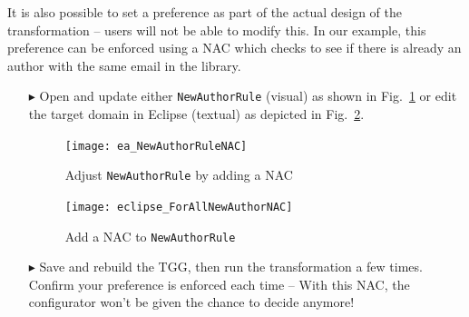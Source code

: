 It is also possible to set a preference as part of the actual design of the transformation -- users will not be able to modify this. In our example, this
preference can be enforced using a NAC which checks to see if there is already an author with the same email in the library.

\begin{itemize}

\item[$\blacktriangleright$] Open and update either \texttt{NewAuthorRule} (visual) as shown in Fig.~\ref{ea:existingAuthorNAC} or edit the target domain in 
Eclipse (textual) as depicted in Fig.~\ref{eclipse:existingAuthorNAC}.

\newpage

\vspace*{0.5cm}

\begin{figure}[htbp]
\begin{center}
  \texttt{[image: ea\_NewAuthorRuleNAC]}
  \caption{Adjust \texttt{NewAuthorRule} by adding a NAC}
  \label{ea:existingAuthorNAC}
\end{center}
\end{figure}

\vspace{0.5cm}

\begin{figure}[htbp]
\begin{center}
  \texttt{[image: eclipse\_ForAllNewAuthorNAC]}
  \caption{Add a NAC to \texttt{NewAuthorRule}}
  \label{eclipse:existingAuthorNAC}
\end{center}
\end{figure}

\vspace{0.5cm}

\item[$\blacktriangleright$] Save and rebuild the TGG, then run the transformation a few times. Confirm your preference is enforced each time -- With this NAC,
the configurator won't be given the chance to decide anymore!

\end{itemize}
